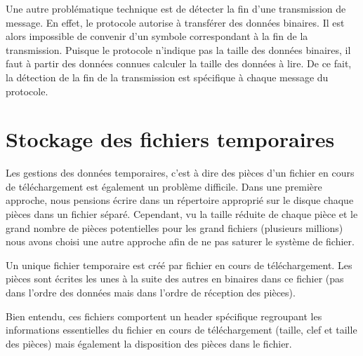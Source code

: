 Une autre problématique technique est de détecter la fin d'une transmission de message. En effet, le protocole autorise à transférer des données binaires. Il est alors impossible de convenir d'un symbole correspondant à la fin de la transmission. Puisque le protocole n'indique pas la taille des données binaires, il faut à partir des données connues calculer la taille des données à lire. De ce fait, la détection de la fin de la transmission est spécifique à chaque message du protocole. 
 
\section{Stockage des fichiers temporaires} 
 
Les gestions des données temporaires, c'est à dire des pièces d'un fichier en cours de téléchargement est également un problème difficile. Dans une première approche, nous pensions écrire dans un répertoire approprié sur le disque chaque pièces dans un fichier séparé. Cependant, vu la taille réduite de chaque pièce et le grand nombre de pièces potentielles pour les grand fichiers (plusieurs millions) nous avons choisi une autre approche afin de ne pas saturer le système de fichier. 
 
Un unique fichier temporaire est créé par fichier en cours de téléchargement. Les pièces sont écrites les unes à la suite des autres en binaires dans ce fichier (pas dans l'ordre des données mais dans l'ordre de réception des pièces). 
  
Bien entendu, ces fichiers comportent un header spécifique regroupant les informations essentielles du fichier en cours de téléchargement (taille, clef et taille des pièces) mais également la disposition des pièces dans le fichier. 
 


